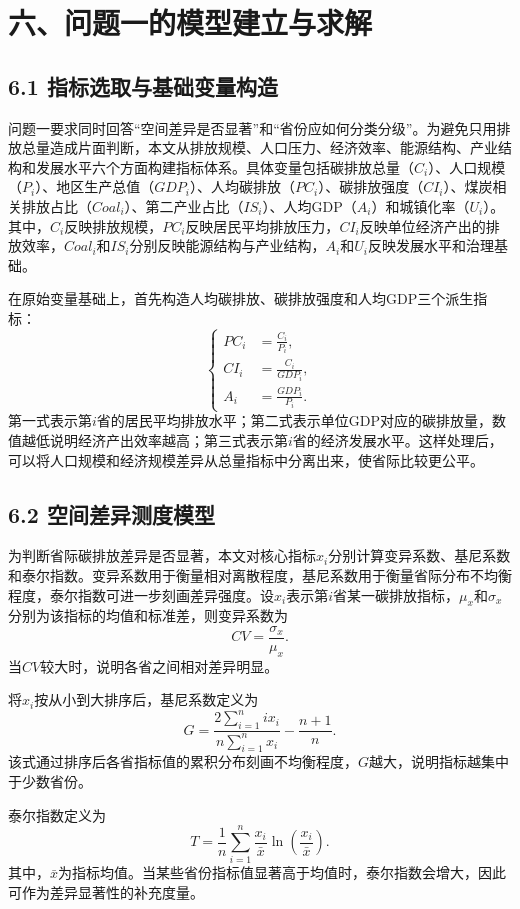 \documentclass[UTF8,zihao=-4,fontset=windows]{ctexart}
\begin{document}
\section*{六、问题一的模型建立与求解}

\subsection*{6.1 指标选取与基础变量构造}

问题一要求同时回答“空间差异是否显著”和“省份应如何分类分级”。为避免只用排放总量造成片面判断，本文从排放规模、人口压力、经济效率、能源结构、产业结构和发展水平六个方面构建指标体系。具体变量包括碳排放总量（$C_i$）、人口规模（$P_i$）、地区生产总值（$GDP_i$）、人均碳排放（$PC_i$）、碳排放强度（$CI_i$）、煤炭相关排放占比（$Coal_i$）、第二产业占比（$IS_i$）、人均GDP（$A_i$）和城镇化率（$U_i$）。其中，$C_i$反映排放规模，$PC_i$反映居民平均排放压力，$CI_i$反映单位经济产出的排放效率，$Coal_i$和$IS_i$分别反映能源结构与产业结构，$A_i$和$U_i$反映发展水平和治理基础。

在原始变量基础上，首先构造人均碳排放、碳排放强度和人均GDP三个派生指标：
\[
\left\{
\begin{aligned}
PC_i&=\frac{C_i}{P_i},\\
CI_i&=\frac{C_i}{GDP_i},\\
A_i&=\frac{GDP_i}{P_i}.
\end{aligned}
\right.
\]
第一式表示第$i$省的居民平均排放水平；第二式表示单位GDP对应的碳排放量，数值越低说明经济产出效率越高；第三式表示第$i$省的经济发展水平。这样处理后，可以将人口规模和经济规模差异从总量指标中分离出来，使省际比较更公平。

\subsection*{6.2 空间差异测度模型}

为判断省际碳排放差异是否显著，本文对核心指标$x_i$分别计算变异系数、基尼系数和泰尔指数。变异系数用于衡量相对离散程度，基尼系数用于衡量省际分布不均衡程度，泰尔指数可进一步刻画差异强度。设$x_i$表示第$i$省某一碳排放指标，$\mu_x$和$\sigma_x$分别为该指标的均值和标准差，则变异系数为
\[
CV=\frac{\sigma_x}{\mu_x}.
\]
当$CV$较大时，说明各省之间相对差异明显。

将$x_i$按从小到大排序后，基尼系数定义为
\[
G=\frac{2\sum_{i=1}^{n}ix_i}{n\sum_{i=1}^{n}x_i}-\frac{n+1}{n}.
\]
该式通过排序后各省指标值的累积分布刻画不均衡程度，$G$越大，说明指标越集中于少数省份。

泰尔指数定义为
\[
T=\frac{1}{n}\sum_{i=1}^{n}\frac{x_i}{\bar{x}}\ln\left(\frac{x_i}{\bar{x}}\right).
\]
其中，$\bar{x}$为指标均值。当某些省份指标值显著高于均值时，泰尔指数会增大，因此可作为差异显著性的补充度量。
\end{document}
